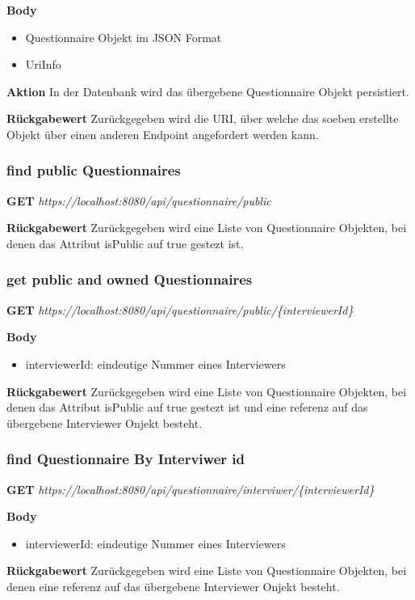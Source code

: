 \textbf{Body}
\begin{itemize}
    \item Questionnaire Objekt im JSON Format
    \item UriInfo
\end{itemize}

\textbf{Aktion}
In der Datenbank wird das übergebene Questionnaire Objekt persistiert.

\textbf{Rückgabewert}
Zurückgegeben wird die URI, über welche das soeben erstellte Objekt über einen anderen Endpoint angefordert werden kann.

\subsubsection{find public Questionnaires}
\textbf{GET} \emph{https://localhost:8080/api/questionnaire/public}

\textbf{Rückgabewert}
Zurückgegeben wird eine Liste von Questionnaire Objekten, bei denen das Attribut isPublic auf true gestezt ist.

\subsubsection{get public and owned Questionnaires}
\textbf{GET} \emph{https://localhost:8080/api/questionnaire/public/\{interviewerId\}}

\textbf{Body}
\begin{itemize}
    \item interviewerId: eindeutige Nummer eines Interviewers
\end{itemize}

\textbf{Rückgabewert}
Zurückgegeben wird eine Liste von Questionnaire Objekten, bei denen das Attribut isPublic auf true gestezt ist 
und eine referenz auf das übergebene Interviewer Onjekt besteht.

\subsubsection{find Questionnaire By Interviwer id}
\textbf{GET} \emph{https://localhost:8080/api/questionnaire/interviwer/\{interviewerId\}}

\textbf{Body}
\begin{itemize}
    \item interviewerId: eindeutige Nummer eines Interviewers
\end{itemize}

\textbf{Rückgabewert}
Zurückgegeben wird eine Liste von Questionnaire Objekten, bei denen 
eine referenz auf das übergebene Interviewer Onjekt besteht.

